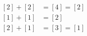 \documentclass[preview]{standalone}
\begin{document}
\begin{align*}
\begin{aligned}\left[2\right] + \left[2\right] &= \left[4\right] = \left[2\right] \\\left[1\right] + \left[1\right] &= \left[2\right] \\\left[2\right] + \left[1\right] &= \left[3\right] = \left[1\right]\end{aligned}
\end{align*}
\end{document}
